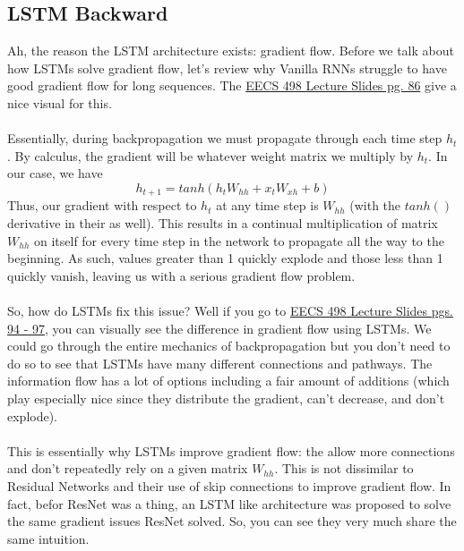 \documentclass[12pt]{article}
\begin{document}
\subsection{LSTM Backward}
Ah, the reason the LSTM architecture exists: gradient flow. Before we talk about how LSTMs 
solve gradient flow, let's review why Vanilla RNNs struggle to have good gradient flow for 
long sequences. The \href{https://web.eecs.umich.edu/~justincj/slides/eecs498/498_FA2019_lecture12.pdf}
{EECS 498 Lecture Slides pg. 86} give a nice visual for this. 
~\\
~\\
Essentially, during backpropagation we must propagate through each time step $h_t$. By calculus, 
the gradient will be whatever weight matrix we multiply by $h_t$. In our case, we have 
\begin{equation}
    h_{t+1} = tanh(h_{t}W_{hh} + x_tW_{xh} + b)
\end{equation}
Thus, our gradient with respect to $h_t$ at any time step is $W_{hh}$ (with the 
$tanh()$ derivative in their as well). This results in a continual multiplication 
of matrix $W_{hh}$ on itself for every time step in the network to propagate all 
the way to the beginning. As such, values greater than 1 quickly explode and those 
less than 1 quickly vanish, leaving us with a serious gradient flow problem. 
~\\
~\\
So, how do LSTMs fix this issue? Well if you go to \href{https://web.eecs.umich.edu/~justincj/slides/eecs498/498_FA2019_lecture12.pdf}
{EECS 498 Lecture Slides pgs. 94 - 97}, you can visually see the difference in gradient 
flow using LSTMs. We could go through the entire mechanics of backpropagation but you don't 
need to do so to see that LSTMs have many different connections and pathways. The information 
flow has a lot of options including a fair amount of additions (which play especially nice since
they distribute the gradient, can't decrease, and don't explode). 
~\\
~\\
This is essentially why LSTMs improve gradient flow: the allow more connections and don't 
repeatedly rely on a given matrix $W_{hh}$. This is not dissimilar to Residual Networks and 
their use of skip connections to improve gradient flow. In fact, befor ResNet was a thing, 
an LSTM like architecture was proposed to solve the same gradient issues ResNet solved. So, 
you can see they very much share the same intuition. 
\end{document}
